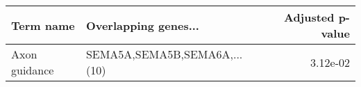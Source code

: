 \begin{tabular}{llr}
\toprule
    Term name &         Overlapping genes... &  Adjusted p-value \\
\midrule
Axon guidance & SEMA5A,SEMA5B,SEMA6A,...(10) &          3.12e-02 \\
\bottomrule
\end{tabular}
